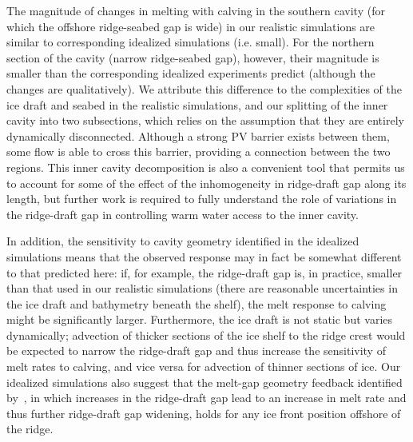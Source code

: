 \documentclass[draft]{agujournal2019}
\begin{document}
The magnitude of changes in melting with calving in the southern cavity (for which the offshore ridge-seabed gap is wide) in our realistic simulations are similar to corresponding idealized simulations (i.e. small). For the northern section of the cavity (narrow ridge-seabed gap), however, their magnitude is smaller than the corresponding idealized experiments predict (although the changes are qualitatively). We attribute this difference to the complexities of the ice draft and seabed in the realistic simulations, and our splitting of the inner cavity into two subsections, which relies on the assumption that they are entirely dynamically disconnected. Although a strong PV barrier exists between them, some flow is able to cross this barrier, providing a connection between the two regions. This inner cavity decomposition is also a convenient tool that permits us to account for some of the effect of the inhomogeneity in ridge-draft gap along its length, but further work is required to fully understand the role of variations in the ridge-draft gap in controlling warm water access to the inner cavity.

In addition, the sensitivity to cavity geometry identified in the idealized simulations means that the observed response may in fact be somewhat different to that predicted here: if, for example, the ridge-draft gap is, in practice, smaller than that used in our realistic simulations (there are reasonable uncertainties in the ice draft and bathymetry beneath the shelf), the melt response to calving might be significantly larger. Furthermore, the ice draft is not static but varies dynamically; advection of thicker sections of the ice shelf to the ridge crest would be expected to narrow the ridge-draft gap and thus increase the sensitivity of melt rates to calving, and vice versa for advection of thinner sections of ice. Our idealized simulations also suggest that the melt-gap geometry feedback identified by~\cite{DeRydt2014JGeophysResOceans}, in which increases in the ridge-draft gap lead to an increase in melt rate and thus further ridge-draft gap widening, holds for any ice front position offshore of the ridge. 
\end{document}
